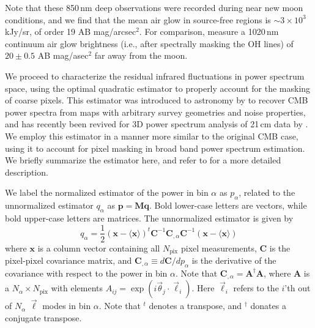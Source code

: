 \documentclass[numberedappendix]{emulateapj}
\newcommand{\Mb}{\mathbf{M}}
\newcommand{\Cb}{\mathbf{C}}
\newcommand{\Ab}{\mathbf{A}}
\newcommand{\xb}{\mathbf{x}}
\begin{document}
Note that these 850\,nm deep observations were recorded during near new moon conditions, and we find that the mean air glow in source-free regions is $\sim3\times10^3$ kJy/sr, of order 19 AB mag/arcsec$^2$. For comparison, \citet{sullivan12} measure a 1020\,nm continuum air glow brightness (i.e., after spectrally masking the OH lines) of $20\pm0.5$ AB mag/asec$^2$ far away from the moon. 

We proceed to characterize the residual infrared fluctuations in power spectrum space, using the optimal quadratic estimator to properly account for the masking of coarse pixels. This estimator was introduced to astronomy by \citet{Maxpowerspeclossless} to recover CMB power spectra from maps with arbitrary survey geometries and noise properties, and has recently been revived for 3D power spectrum analysis of 21\,cm data by \citet{X13, dillonneben, LT11, DillonFast, ali15}. We employ this estimator in a manner more similar to the original CMB case, using it to account for pixel masking in broad band power spectrum estimation. We briefly summarize the estimator here, and refer to \citet{X13} for a more detailed description.

We label the normalized estimator of the power in bin $\alpha$ as $p_\alpha$, related to the unnormalized estimator $q_\alpha$ as $\mathbf{p} = \Mb \mathbf{q}$. Bold lower-case letters are vectors, while bold upper-case letters are matrices. The unnormalized estimator is given by
\begin{equation}
q_\alpha = \frac{1}{2}(\xb-\langle\xb\rangle)^t \Cb^{-1} \Cb_{,\alpha}\Cb^{-1}(\xb-\langle\xb\rangle)
\end{equation}
where $\xb$ is a column vector containing all $N_\text{pix}$ pixel measurements, $\Cb$ is the pixel-pixel covariance matrix, and $\Cb_{,\alpha}\equiv d\Cb/dp_\alpha$ is the derivative of the covariance with respect to the power in bin $\alpha$. Note that $\Cb_{,\alpha} = \Ab^\dagger\Ab$, where $\Ab$ is a $N_\alpha\times N_\text{pix}$ with elements $A_{ij}=\exp(i\vec{\theta}_j\cdot\vec{\ell}_i)$. Here $\vec{\ell}_i$ refers to the $i$'th out of $N_\alpha$ $\vec{\ell}$ modes in bin $\alpha$. Note that $^t$ denotes a transpose, and $^\dagger$ donates a conjugate transpose.
\end{document}
